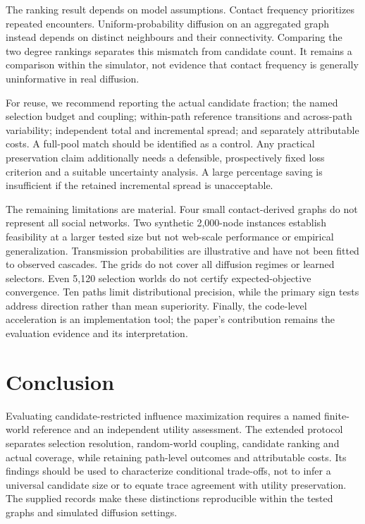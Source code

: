 The ranking result depends on model assumptions. Contact frequency prioritizes repeated encounters. Uniform-probability diffusion on an aggregated graph instead depends on distinct neighbours and their connectivity. Comparing the two degree rankings separates this mismatch from candidate count. It remains a comparison within the simulator, not evidence that contact frequency is generally uninformative in real diffusion.

For reuse, we recommend reporting the actual candidate fraction; the named selection budget and coupling; within-path reference transitions and across-path variability; independent total and incremental spread; and separately attributable costs. A full-pool match should be identified as a control. Any practical preservation claim additionally needs a defensible, prospectively fixed loss criterion and a suitable uncertainty analysis. A large percentage saving is insufficient if the retained incremental spread is unacceptable.

The remaining limitations are material. Four small contact-derived graphs do not represent all social networks. Two synthetic 2,000-node instances establish feasibility at a larger tested size but not web-scale performance or empirical generalization. Transmission probabilities are illustrative and have not been fitted to observed cascades. The grids do not cover all diffusion regimes or learned selectors. Even 5,120 selection worlds do not certify expected-objective convergence. Ten paths limit distributional precision, while the primary sign tests address direction rather than mean superiority. Finally, the code-level acceleration is an implementation tool; the paper's contribution remains the evaluation evidence and its interpretation.

\section{Conclusion}
Evaluating candidate-restricted influence maximization requires a named finite-world reference and an independent utility assessment. The extended protocol separates selection resolution, random-world coupling, candidate ranking and actual coverage, while retaining path-level outcomes and attributable costs. Its findings should be used to characterize conditional trade-offs, not to infer a universal candidate size or to equate trace agreement with utility preservation. The supplied records make these distinctions reproducible within the tested graphs and simulated diffusion settings.

